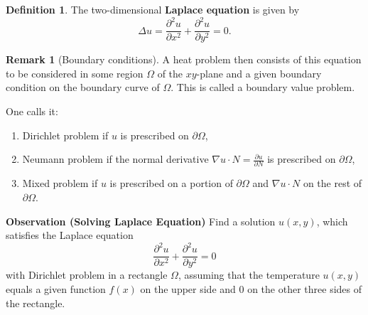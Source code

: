 \documentclass[12pt,openany]{book}
\theoremstyle{definition}
\newtheorem{definition}{Definition}[chapter]
\newtheorem{remark}{Remark}[chapter]
\begin{document}
	\begin{tcolorbox}[colframe=defcolor, title={\color{white}\bf Laplace Equation}]
		\begin{definition}
			The two-dimensional \textbf{Laplace equation} is given by
			\[
			\Delta u = \frac{\partial^2 u}{\partial x^2} + \frac{\partial^2 u}{\partial y^2} = 0.
			\]
		\end{definition}
	\end{tcolorbox}
	\begin{remark}[Boundary conditions]
		A heat problem then consists of this equation to be considered in some region \( \Omega \) of the \( xy \)-plane and a given boundary condition on the boundary curve of \( \Omega \). This is called a boundary value problem.
		\begin{figure}[h!]\centering
		\end{figure} 
		
		One calls it:
		\begin{enumerate}
			\item Dirichlet problem if \( u \) is prescribed on \( \partial\Omega \),
			\item Neumann problem if the normal derivative \( \nabla u \cdot N = \frac{\partial u}{\partial N} \) is prescribed on \( \partial\Omega \),
			\item Mixed problem if \( u \) is prescribed on a portion of \( \partial\Omega \) and \( \nabla u \cdot N \) on the rest of \( \partial\Omega \).
		\end{enumerate}
	\end{remark}
	
	\textbf{Observation (Solving Laplace Equation)}
	Find a solution \( u(x, y) \), which satisfies the Laplace equation
	\[
	\frac{\partial^2 u}{\partial x^2} + \frac{\partial^2 u}{\partial y^2} = 0
	\]
	with Dirichlet problem in a rectangle \( \Omega \), assuming that the temperature \( u(x, y) \) equals a given function \( f(x) \) on the upper side and 0 on the other three sides of the rectangle.
	
\end{document}
